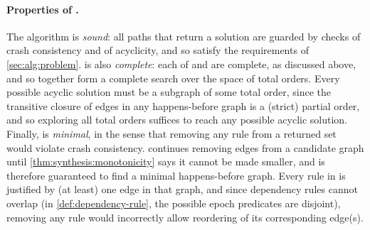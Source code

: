 \paragraph{Properties of .}
The  algorithm is \emph{sound}:
all paths that return a solution are guarded by checks of crash consistency and of acyclicity,
and so satisfy the requirements of \cref{sec:alg:problem}.
 is also \emph{complete}:
each of \phaseone and \phasetwo are complete, as discussed above,
and so together form a complete search over the space of total orders. 
Every possible acyclic solution must be a subgraph of some total order,
since the transitive closure of edges in any happens-before graph is a (strict) partial order,
and so exploring all total orders suffices to reach any possible acyclic solution.
Finally,  is \emph{minimal},
in the sense that removing any rule from a returned set 
would violate crash consistency. 
\phasetwo continues removing edges from a candidate graph \gr
until \cref{thm:synthesis:monotonicity} says it cannot be made smaller,
and is therefore guaranteed to find a minimal happens-before graph. 
Every rule in  is justified by (at least) one edge in that graph,
and since dependency rules cannot overlap
(in \cref{def:dependency-rule}, the possible epoch predicates are disjoint),
removing any rule would incorrectly allow reordering of its corresponding edge(s).


